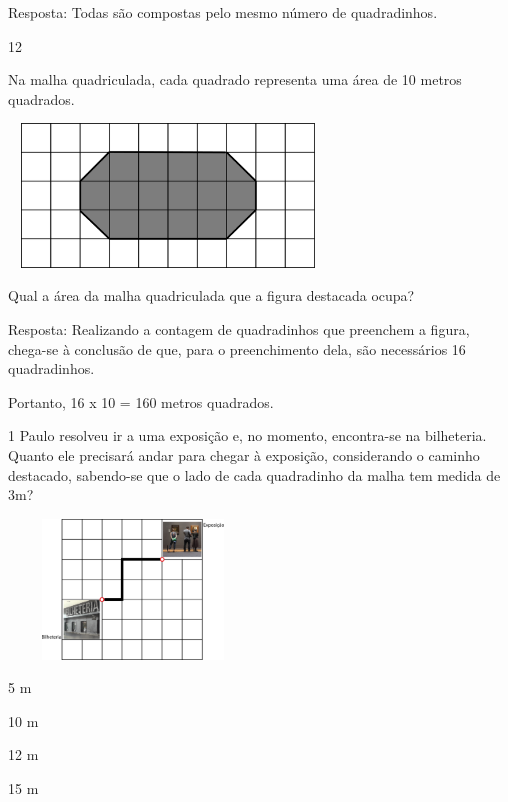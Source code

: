 \begin{multicols}{2}

Resposta:
Todas são compostas pelo mesmo número de quadradinhos.

\num{12}

Na malha quadriculada, cada quadrado representa uma área de 10 metros quadrados.


\includegraphics[width=3.33333in,height=1.50517in]{media/image60.png}

Qual a área da malha quadriculada que a figura destacada ocupa?


Resposta:
Realizando a contagem de quadradinhos que preenchem a figura, chega-se à conclusão de que, para o preenchimento dela, são necessários 16 quadradinhos.

Portanto, 16 x 10 = 160 metros quadrados.


\num{1} Paulo resolveu ir a uma exposição e, no momento, encontra-se na
bilheteria. Quanto ele precisará andar para chegar à exposição,
considerando o caminho destacado, sabendo-se que o lado de cada
quadradinho da malha tem medida de 3m?


\includegraphics[width=2.60897in,height=1.46587in]{media/image61.png}

\begin{escolha}
\item
  5 m
\item
  10 m
\item
  12 m
\item
  15 m
\end{escolha}


\end{multicols}
